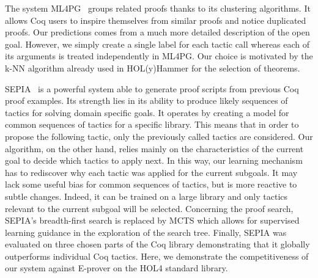\documentclass[runningheads,a4paper,draft]{svjour3}
\def\holfour{\textsf{HOL4}\xspace}
\def\coq{\textsf{Coq}\xspace}
\def\eprover{\textsf{E-prover}\xspace}
\def\holyhammer{\textsf{HOL(y)Hammer}\xspace}
\begin{document}
The system
\textsf{ML4PG}~\cite{DBLP:journals/corr/abs-1212-3618,DBLP:journals/mics/HerasK14}
groups related proofs thanks to its clustering
algorithms. It allows \coq users to inspire themselves from similar proofs and
notice
duplicated proofs. Our predictions comes from a much more detailed description
of the open goal.
However, we simply create a single label for each tactic call whereas each of
its
arguments is treated independently in \textsf{ML4PG}.
Our choice is motivated by the k-NN algorithm already used in
\holyhammer for the selection of theorems.

\textsf{SEPIA}~\cite{DBLP:conf/cade/GransdenWR15} is a powerful system able to
generate
proof scripts from previous \coq proof examples.
Its strength lies in its ability to produce likely sequences
of tactics for solving domain specific goals. It operates by creating a model
for common sequences of tactics for a specific library.
This means that in order to propose the following tactic, only the previously
called tactics
are considered.
Our algorithm, on the other hand, relies mainly on the characteristics of the
current goal
to decide
which tactics to apply next. In this way, our learning mechanism has to
rediscover why each
tactic was applied for the current subgoals. It may lack some useful bias for
common sequences
of tactics, but is more reactive to subtle changes. Indeed, it can be trained
on a large library and only tactics relevant to the current subgoal will be
selected.
Concerning the proof search, \textsf{SEPIA}'s %
breadth-first search is replaced by MCTS which allows for supervised learning
guidance in the exploration of the search tree.
Finally, \textsf{SEPIA} was evaluated on three chosen parts of the
\coq library demonstrating that it globally outperforms individual \coq
tactics. Here, we demonstrate the competitiveness of our system against
\eprover on the \holfour standard library.
\end{document}
